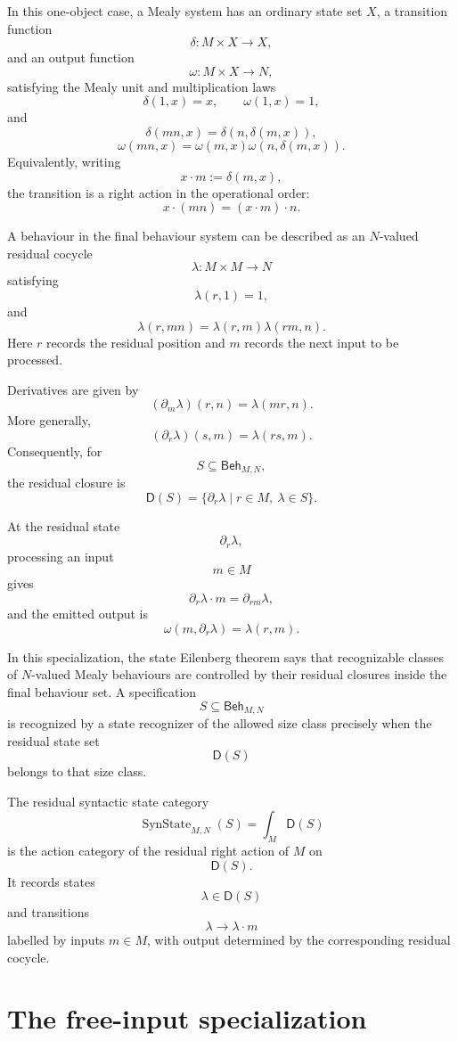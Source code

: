 In this one-object case, a Mealy system has an ordinary state set \(X\), a
transition function
\[
\delta:M\times X\to X,
\]
and an output function
\[
\omega:M\times X\to N,
\]
satisfying the Mealy unit and multiplication laws
\[
\delta(1,x)=x,
\qquad
\omega(1,x)=1,
\]
and
\[
\delta(mn,x)=\delta(n,\delta(m,x)),
\]
\[
\omega(mn,x)=\omega(m,x)\omega(n,\delta(m,x)).
\]
Equivalently, writing
\[
x\cdot m:=\delta(m,x),
\]
the transition is a right action in the operational order:
\[
x\cdot(mn)=(x\cdot m)\cdot n.
\]

A behaviour in the final behaviour system can be described as an
\(N\)-valued residual cocycle
\[
\lambda:M\times M\to N
\]
satisfying
\[
\lambda(r,1)=1,
\]
and
\[
\lambda(r,mn)=\lambda(r,m)\lambda(rm,n).
\]
Here \(r\) records the residual position and \(m\) records the next input to
be processed.

Derivatives are given by
\[
(\partial_m\lambda)(r,n)=\lambda(mr,n).
\]
More generally,
\[
(\partial_r\lambda)(s,m)=\lambda(rs,m).
\]
Consequently, for
\[
S\subseteq\mathsf{Beh}_{M,N},
\]
the residual closure is
\[
\mathsf D(S)
=
\{\partial_r\lambda\mid r\in M,\ \lambda\in S\}.
\]

At the residual state
\[
\partial_r\lambda,
\]
processing an input
\[
m\in M
\]
gives
\[
\partial_r\lambda\cdot m
=
\partial_{rm}\lambda,
\]
and the emitted output is
\[
\omega(m,\partial_r\lambda)
=
\lambda(r,m).
\]

In this specialization, the state Eilenberg theorem says that recognizable
classes of \(N\)-valued Mealy behaviours are controlled by their residual
closures inside the final behaviour set. A specification
\[
S\subseteq\mathsf{Beh}_{M,N}
\]
is recognized by a state recognizer of the allowed size class precisely when
the residual state set
\[
\mathsf D(S)
\]
belongs to that size class.

The residual syntactic state category
\[
\operatorname{SynState}_{M,N}(S)
=
\int_M \mathsf D(S)
\]
is the action category of the residual right action of \(M\) on
\[
\mathsf D(S).
\]
It records states
\[
\lambda\in\mathsf D(S)
\]
and transitions
\[
\lambda
\longrightarrow
\lambda\cdot m
\]
labelled by inputs \(m\in M\), with output determined by the corresponding
residual cocycle.

\section{The free-input specialization}
\label{sec:state-eilenberg-free-input-specialization}

